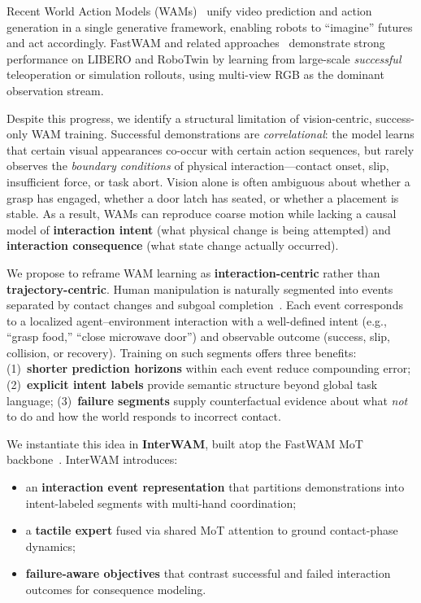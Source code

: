 \documentclass{article}
\begin{document}
Recent World Action Models (WAMs)~\citep{fastwam2026} unify video prediction and action generation in a single generative framework, enabling robots to ``imagine'' futures and act accordingly.
FastWAM and related approaches~\citep{cosmos2025,genie2024} demonstrate strong performance on LIBERO and RoboTwin by learning from large-scale \emph{successful} teleoperation or simulation rollouts, using multi-view RGB as the dominant observation stream.

Despite this progress, we identify a structural limitation of vision-centric, success-only WAM training.
Successful demonstrations are \emph{correlational}: the model learns that certain visual appearances co-occur with certain action sequences, but rarely observes the \emph{boundary conditions} of physical interaction---contact onset, slip, insufficient force, or task abort.
Vision alone is often ambiguous about whether a grasp has engaged, whether a door latch has seated, or whether a placement is stable.
As a result, WAMs can reproduce coarse motion while lacking a causal model of \textbf{interaction intent} (what physical change is being attempted) and \textbf{interaction consequence} (what state change actually occurred).

We propose to reframe WAM learning as \textbf{interaction-centric} rather than \textbf{trajectory-centric}.
Human manipulation is naturally segmented into events separated by contact changes and subgoal completion~\citep{konidaris2018skills}.
Each event corresponds to a localized agent--environment interaction with a well-defined intent (e.g., ``grasp food,'' ``close microwave door'') and observable outcome (success, slip, collision, or recovery).
Training on such segments offers three benefits:
(1)~\textbf{shorter prediction horizons} within each event reduce compounding error;
(2)~\textbf{explicit intent labels} provide semantic structure beyond global task language;
(3)~\textbf{failure segments} supply counterfactual evidence about what \emph{not} to do and how the world responds to incorrect contact.

We instantiate this idea in \textbf{InterWAM}, built atop the FastWAM MoT backbone~\citep{fastwam2026}.
InterWAM introduces:
\begin{itemize}
    \item an \textbf{interaction event representation} that partitions demonstrations into intent-labeled segments with multi-hand coordination;
    \item a \textbf{tactile expert} fused via shared MoT attention to ground contact-phase dynamics;
    \item \textbf{failure-aware objectives} that contrast successful and failed interaction outcomes for consequence modeling.
\end{itemize}
\end{document}
